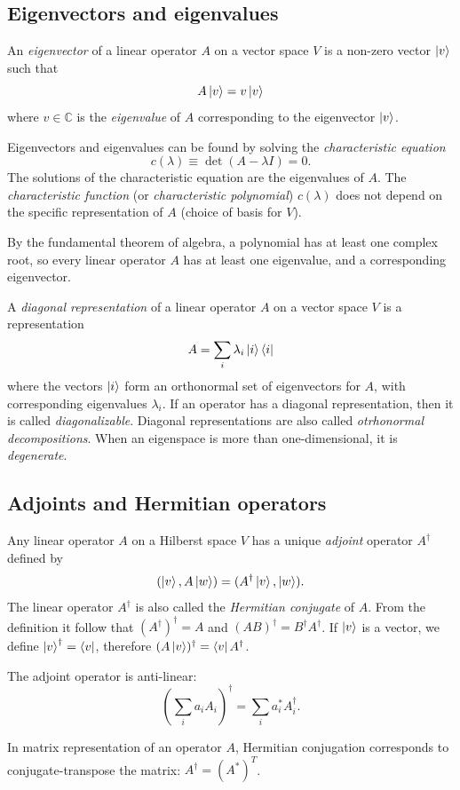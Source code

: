 \subsection{Eigenvectors and eigenvalues}
An \emph{eigenvector} of a linear operator $A$ on a vector space $V$ is a non-zero vector $\ket{v}$ such that
\[
    A\ket{v} = v \ket{v}
\]
where $v \in \mathbb{C}$ is the \emph{eigenvalue} of $A$ corresponding to the eigenvector $\ket{v}$.

Eigenvectors and eigenvalues can be found by solving the \emph{characteristic equation}
\[
    c(\lambda) \equiv \det(A - \lambda I) = 0.
\]
The solutions of the characteristic equation are the eigenvalues of $A$.
The \emph{characteristic function} (or \emph{characteristic polynomial}) $c(\lambda)$ does not depend on the specific representation of $A$
(choice of basis for $V$).

By the fundamental theorem of algebra,
a polynomial has at least one complex root,
so every linear operator $A$ has at least one eigenvalue,
and a corresponding eigenvector.

A \emph{diagonal representation} of a linear operator $A$ on a vector space $V$ is a representation
\[
    A = \sum_i \lambda_i \ket{i}\bra{i}
\]
where the vectors $\ket{i}$ form an orthonormal set of eigenvectors for $A$,
with corresponding eigenvalues $\lambda_i$.
If an operator has a diagonal representation, then it is called \emph{diagonalizable}.
Diagonal representations are also called \emph{otrhonormal decompositions}.
When an eigenspace is more than one-dimensional, it is \emph{degenerate}.

\subsection{Adjoints and Hermitian operators}
Any linear operator $A$ on a Hilberst space $V$ has a unique \emph{adjoint} operator $A^\dagger$ defined by
\[
    (\ket{v}, A\ket{w}) = (A^\dagger\ket{v}, \ket{w}).
\]
The linear operator $A^\dagger$ is also called the \emph{Hermitian conjugate} of $A$.
From the definition it follow that $(A^\dagger)^\dagger = A$ and $(AB)^\dagger = B^\dagger A^\dagger$.
If $\ket{v}$ is a vector, we define $\ket{v}^\dagger = \bra{v}$, therefore $(A\ket{v})^\dagger = \bra{v}A^\dagger$.

The adjoint operator is anti-linear:
\[
    (\sum_i a_iA_i)^\dagger = \sum_i a_i^* A_i^\dagger.
\]

In matrix representation of an operator $A$,
Hermitian conjugation corresponds to conjugate-transpose the matrix: $A^\dagger = (A^*)^T$.

